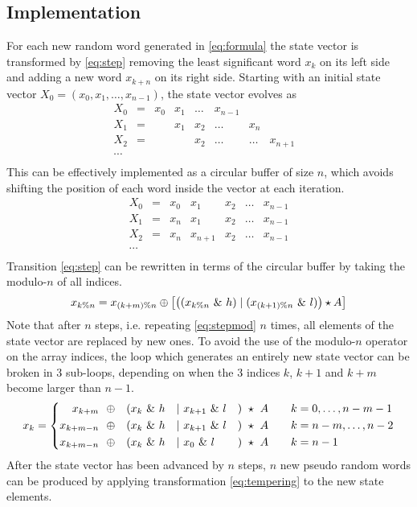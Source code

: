 \documentclass[preprint,1p,times]{elsarticle}
\begin{document}
\subsection{Implementation}
\noindent For each new random word generated in \eqref{eq:formula} the state vector is transformed by \eqref{eq:step} removing the least significant word $x_{k}$ on its left side and adding a new word $x_{k+n}$ on its right side. Starting with an initial state vector $X_0=(x_0, x_1, \dots, x_{n-1})$, the state vector evolves as
$$
\begin{matrix}
X_0 &=& x_0 & x_1 & \dots & x_{n-1} &\\
X_1 &=& & x_1 & x_2 & \dots & x_{n} & \\
X_2 &=& & & x_2 & \dots & \dots & x_{n+1} &\\
\cdots \\
\end{matrix}
$$
This can be effectively implemented as a circular buffer of size $n$, which avoids shifting the position of each word inside the vector at each iteration.
\begin{equation}
\label{eq:staterec}
\begin{matrix}
X_0 &=& x_0 & x_1 & x_2 & \dots & x_{n-1} \\
X_1 &=& x_{n} & x_1 & x_2 & \dots & x_{n-1} \\
X_2 &=& x_{n} & x_{n+1} & x_2 & \dots & x_{n-1} \\
\cdots \\
\end{matrix}
\end{equation}
Transition \eqref{eq:step} can be rewritten in terms of the circular buffer by taking the modulo-$n$ of all indices.
\begin{equation}
\label{eq:stepmod}
x_{k\%n} = x_{(k+m)\% n} \mathbin{\oplus} \left[ \left(({x_{k\%n}}~\&~h) \mid (x_{(k+1)\%n}~\&~l)\right) \star A \right]
\end{equation}
Note that after $n$ steps, i.e. repeating \eqref{eq:stepmod} $n$ times, all elements of the state vector are replaced by new ones. To avoid the use of the modulo-$n$ operator on the array indices, the loop which generates an entirely new state vector can be broken in 3 sub-loops, depending on when the 3 indices $k$, $k+1$ and $k+m$ become larger than $n-1$.
\begin{equation}
\label{eq:stepnomod}
	x_k = \left\{
		\begin{aligned}
			x_{k+m}   & ~~\mathbin{\oplus} & ( & x_{k} ~\&~ h & \mid~ & x_{k+1} ~\&~ l & ) &~\star~ A &\quad &k = 0, \dots, n-m-1\\
			x_{k+m-n} & ~~\mathbin{\oplus} & ( & x_{k} ~\&~ h & \mid~ & x_{k+1} ~\&~ l & ) &~\star~ A &\quad &k = n-m, \dots, n-2 \\
			x_{k+m-n} & ~~\mathbin{\oplus} & ( & x_{k} ~\&~ h & \mid~ & x_{0}   ~\&~ l & ) &~\star~ A &\quad &k = n-1
		\end{aligned}
    \right.
\end{equation}
After the state vector has been advanced by $n$ steps, $n$ new pseudo random words can be produced by applying transformation \eqref{eq:tempering} to the new state elements.
\end{document}
